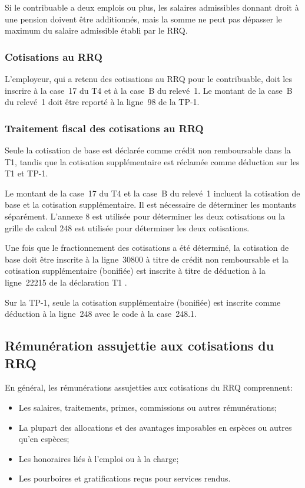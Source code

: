 \begin{note}
	Si le contribuable a deux emplois ou plus, les salaires admissibles donnant droit à une pension doivent être additionnés, mais la somme ne peut pas dépasser le maximum du salaire admissible établi par le RRQ.
\end{note}

\subsubsection{Cotisations au RRQ}
L'employeur, qui a retenu des cotisations au RRQ pour le contribuable, doit les inscrire à la case~17 du T4 et à la case~B du relevé~1. Le montant de la case~B du relevé~1 doit être reporté à la ligne~98 de la TP-1.

\subsubsection{Traitement fiscal des cotisations au RRQ}
Seule la cotisation de base est déclarée comme crédit non remboursable dans la T1, tandis que la cotisation supplémentaire est réclamée comme déduction sur les T1 et TP-1.

Le montant de la case~17 du T4 et la case~B du relevé~1 incluent la cotisation de base et la cotisation supplémentaire. Il est nécessaire de déterminer les montants séparément. L'annexe 8 est utilisée pour déterminer les deux cotisations ou la grille de calcul 248 est utilisée pour déterminer les deux cotisations.

Une fois que le fractionnement des cotisations a été déterminé, la cotisation de base doit être inscrite à la ligne~30800 à titre de crédit non remboursable et la cotisation supplémentaire (bonifiée) est inscrite à titre de déduction à la ligne~22215 de la déclaration T1 .

Sur la TP-1, seule la cotisation supplémentaire (bonifiée) est inscrite comme déduction à la ligne~248 avec le code  \fg{} à la case~248.1.


\subsection{Rémunération assujettie aux cotisations du RRQ}
En général, les rémunérations assujetties aux cotisations du RRQ comprennent:
\begin{itemize}
	\item Les salaires, traitements, primes, commissions ou autres rémunérations;
	\item La plupart des allocations et des avantages imposables en espèces ou autres qu'en espèces;
	\item Les honoraires liés à l'emploi ou à la charge; 
	\item Les pourboires et gratifications reçus pour services rendus.
\end{itemize}

